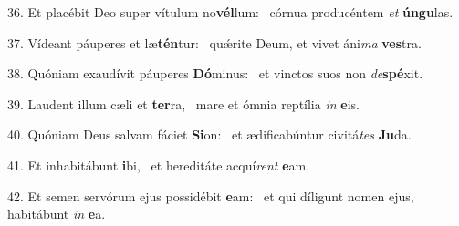 36. Et placébit Deo super vítulum no\textbf{vél}lum: \ast\  córnua producéntem \textit{et} \textbf{ún}\textbf{gu}las.\

37. Vídeant páuperes et læ\textbf{tén}tur: \ast\  quǽrite Deum, et vivet áni\textit{ma} \textbf{ves}tra.\

38. Quóniam exaudívit páuperes \textbf{Dó}minus: \ast\  et vinctos suos non \textit{de}\textbf{spé}xit.\

39. Laudent illum cæli et \textbf{ter}ra, \ast\  mare et ómnia reptília \textit{in} \textbf{e}is.\

40. Quóniam Deus salvam fáciet \textbf{Si}on: \ast\  et ædificabúntur civitá\textit{tes} \textbf{Ju}da.\

41. Et inhabitábunt \textbf{i}bi, \ast\  et hereditáte acquí\textit{rent} \textbf{e}am.\

42. Et semen servórum ejus possidébit \textbf{e}am: \ast\  et qui díligunt nomen ejus, habitábunt \textit{in} \textbf{e}a.\

